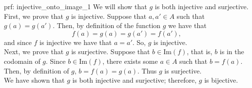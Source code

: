 \begin{prf}{prf: injective_onto_image_1} 
We will show that $g$ is both injective and surjective.\\

First, we prove that $g$ is injective. Suppose that $a,a' \in A$ such that $g(a) = g(a')$.  Then, by definition of the function $g$ we have that  \[f(a) =g(a) = g(a') = f(a'),\] and since $f$ is injective we have that $a = a'$. So, $g$ is injective. \\

Next, we prove that $g$ is surjective. Suppose that $b \in \text{Im}(f)$, that is, $b$ is in the codomain of $g$. Since $b \in \text{Im}(f)$, there exists some $a \in A$ such that $b = f(a)$. Then, by definition of $g$,  $b = f(a) = g(a)$. Thus $g$ is surjective. \\

We have shown that $g$ is both injective and surjective; therefore, $g$ is bijective. 
\end{prf}